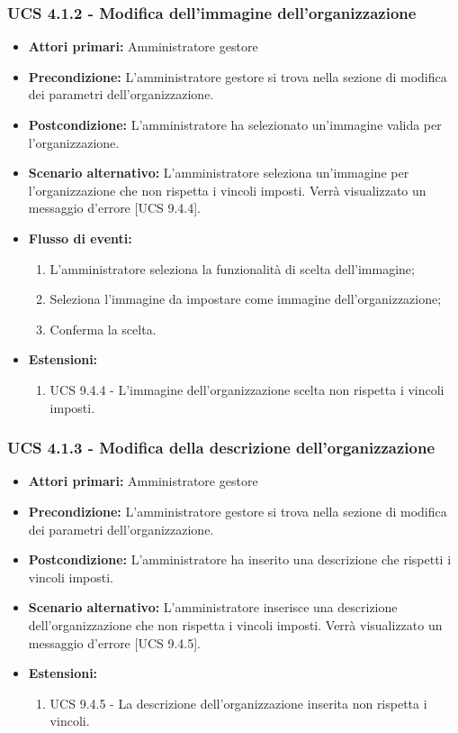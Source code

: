 \subsubsection{UCS 4.1.2 - Modifica dell'immagine dell'organizzazione}%
\begin{itemize}
\item \textbf{Attori primari:} Amministratore gestore
\item \textbf{Precondizione:} L'amministratore gestore si trova nella sezione di modifica dei parametri dell'organizzazione.
\item \textbf{Postcondizione:} L'amministratore ha selezionato un'immagine valida per l'organizzazione.
\item \textbf{Scenario alternativo:} L'amministratore seleziona un'immagine per l'organizzazione che non rispetta i vincoli imposti. Verrà visualizzato un messaggio d'errore [UCS 9.4.4].
\item \textbf{Flusso di eventi:}
\begin{enumerate}
    \item L'amministratore seleziona la funzionalità di scelta dell'immagine;
    \item Seleziona l'immagine da impostare come immagine dell'organizzazione;
    \item Conferma la scelta.
\end{enumerate}
\item \textbf{Estensioni:}
\begin{enumerate}
    \item UCS 9.4.4 - L'immagine dell'organizzazione scelta non rispetta i vincoli imposti.
\end{enumerate}
\end{itemize}

\subsubsection{UCS 4.1.3 - Modifica della descrizione dell'organizzazione}%
\begin{itemize}
\item \textbf{Attori primari:} Amministratore gestore
\item \textbf{Precondizione:} L'amministratore gestore si trova nella sezione di modifica dei parametri dell'organizzazione.
\item \textbf{Postcondizione:} L'amministratore ha inserito una descrizione che rispetti i vincoli imposti.
\item \textbf{Scenario alternativo:} L'amministratore inserisce una descrizione dell'organizzazione che non rispetta i vincoli imposti. Verrà visualizzato un messaggio d'errore [UCS 9.4.5].
\item \textbf{Estensioni:}
\begin{enumerate}
    \item UCS 9.4.5 - La descrizione dell'organizzazione inserita non rispetta i vincoli.
\end{enumerate}
\end{itemize}


